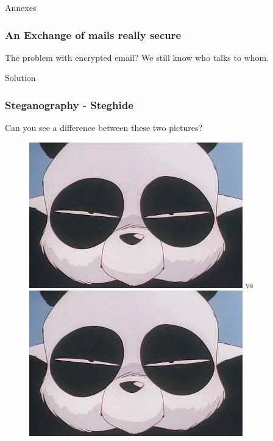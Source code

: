 \begin{frame}
\begin{center}
\huge{Annexes}
\end{center}
\end{frame}

\begin{frame}
\frametitle{An Exchange of mails really secure}

The problem with encrypted email? We still know who talks to whom.
\begin{block}{Solution}
\end{block}
\end{frame}

\begin{frame}
\frametitle{Steganography - Steghide}

Can you see a difference between these two pictures?
\begin{figure}
\includegraphics[width=0.3\linewidth]{./materials/Steghide.jpg}
 vs
\includegraphics[width=0.3\linewidth]{./materials/Steghide.jpg}
\end{figure}
\end{frame}

